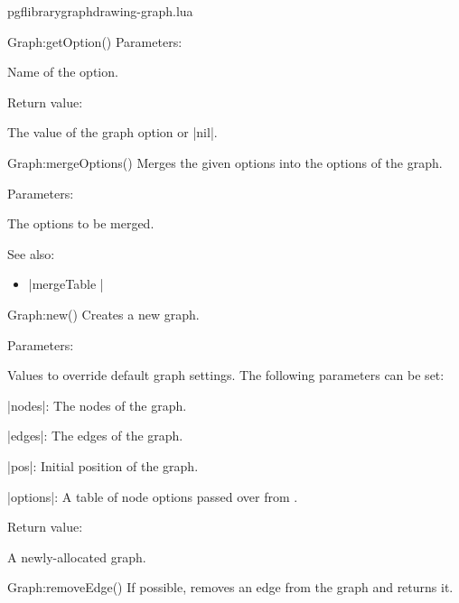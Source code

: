 \begin{filedescription}{pgflibrarygraphdrawing-graph.lua}
\begin{luacommand}{{Graph:getOption}()}
Parameters:
\begin{parameterdescription}
	\item[\meta{name}] Name of the option. 
\end{parameterdescription}


Return value:
\begin{parameterdescription} 
  \item[] The value of the graph option  or |nil|. 
\end{parameterdescription}


\end{luacommand}
\begin{luacommand}{{Graph:mergeOptions}()}
Merges the given options into the options of the graph. 

Parameters:
\begin{parameterdescription}
	\item[\meta{options}] The options to be merged. 
\end{parameterdescription}



See also:
\begin{itemize}
	\item[] |mergeTable |
\end{itemize}

\end{luacommand}
\begin{luacommand}{{Graph:new}()}
Creates a new graph. 

Parameters:
\begin{parameterdescription}
	\item[\meta{values}] Values to override default graph settings. The following parameters can be set:\par |nodes|: The nodes of the graph.\par |edges|: The edges of the graph.\par |pos|: Initial position of the graph.\par |options|: A table of node options passed over from \tikzname. 
\end{parameterdescription}


Return value:
\begin{parameterdescription} 
  \item[] A newly-allocated graph. 
\end{parameterdescription}


\end{luacommand}
\begin{luacommand}{{Graph:removeEdge}()}
If possible, removes an edge from the graph and returns it. 


\end{luacommand}
\end{filedescription}
